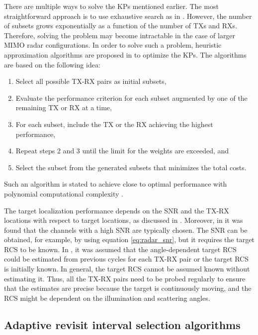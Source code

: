 \documentclass[english, 12pt, a4paper, elec, utf8, a-1b, online]{aaltothesis}
\begin{document}
There are multiple ways to solve the KPs mentioned earlier.
The most straightforward approach is to use exhaustive search as in \cite{Sun2014}.
However, the number of subsets grows exponentially as a function of the number of TXs and RXs.
Therefore, solving the problem may become intractable in the case of larger MIMO radar configurations.
In order to solve such a problem, heuristic approximation algorithms are proposed in \cite{Godrich2011a, Godrich2011} to optimize the KPs.
The algorithms are based on the following idea:
\begin{enumerate}
    \item Select all possible TX-RX pairs as initial subsets,
    \item Evaluate the performance criterion for each subset augmented by one of the remaining TX or RX at a time, 
    \item For each subset, include the TX or the RX achieving the highest performance,
    \item Repeat steps 2 and 3 until the limit for the weights are exceeded, and
    \item Select the subset from the generated subsets that minimizes the total costs. 
\end{enumerate}
Such an algorithm is stated to achieve close to optimal performance with polynomial computational complexity \cite{Godrich2011a, Godrich2011}.

The target localization performance depends on the SNR and the TX-RX locations with respect to target locations, as discussed in \cite{Sun2014}.
Moreover, in \cite{Sun2014} it was found that the channels with a high SNR are typically chosen.
The SNR can be obtained, for example, by using equation \eqref{eq:radar_snr}, but it requires the target RCS to be known.
In \cite{Godrich2011a, Godrich2011, Sun2014}, it was assumed that the angle-dependent target RCS could be estimated from previous cycles for each TX-RX pair or the target RCS is initially known.
In general, the target RCS cannot be assumed known without estimating it. 
Thus, all the TX-RX pairs need to be probed regularly to ensure that the estimates are precise because the target is continuously moving, and the RCS might be dependent on the illumination and scattering angles.


\subsection{Adaptive revisit interval selection algorithms} \label{sec:tbm_ri}
\end{document}
